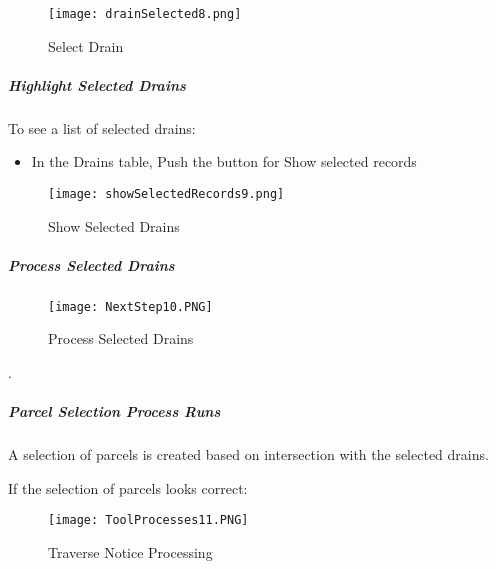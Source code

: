 \begin{figure}[h!]
 \centering
     \texttt{[image: drainSelected8.png]}
 \caption{Select Drain}


 \end{figure}

\clearpage
     
  
\subparagraph{Highlight Selected Drains}

\noindent To see a list of selected drains:

\begin{itemize}

\item In the Drains table, Push the button for Show selected records

\end{itemize}

\begin{figure}[h!]
 \centering
     \texttt{[image: showSelectedRecords9.png]}
 \caption{Show Selected Drains}

 \end{figure}

\clearpage

\subparagraph{Process Selected Drains}

  \begin{wrapfigure}{r}{0.6\textwidth}
  \centering
      \texttt{[image: NextStep10.PNG]}
  \caption{Process Selected Drains}
  \end{wrapfigure}
.

  \vspace{1.75in}



\clearpage

\subparagraph{Parcel Selection Process Runs}
\vspace{.5in}

\noindent A selection of parcels is created based on intersection with the selected drains.

\vspace{.5in}

\noindent If the selection of parcels looks correct:


\begin{figure}[h!]
 \centering
     \texttt{[image: ToolProcesses11.PNG]}
 \caption{Traverse Notice Processing}


 \end{figure}
 
